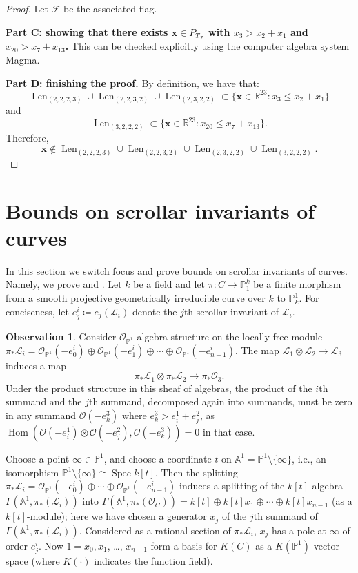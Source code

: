 \documentclass[letterpaper,10pt]{amsart}
\DeclareMathOperator{\Hom}{Hom}
\DeclareMathOperator{\Spec}{Spec}
\DeclareMathOperator{\Len}{Len}
\newcommand{\RR}{\mathbb{R}}      %
\newcommand{\AAA}{\mathbb{A}}      %
\newcommand{\cO}{\mathcal{O}}      %
\newcommand{\PP}{\mathbb{P}}      %
\newcommand{\cF}{\mathcal{F}}
\newcommand{\cL}{\mathcal{L}}
\theoremstyle{definition}
\newtheorem{observation}[theorem]{Observation}
\theoremstyle{remark}
\begin{document}
\begin{proof}
\noindent Let $\cF$ be the associated flag.  

\noindent \textbf{Part C: showing that there exists $\mathbf{x} \in P_{T_{\cF}}$ with $x_3 > x_2 + x_1$ and $x_{20} > x_7 + x_{13}$.}
This can be checked explicitly using the computer algebra system Magma.

\noindent \textbf{Part D: finishing the proof.}
By definition, we have that: 
\[
	\Len_{(2,2,2,3)} \cup \Len_{(2,2,3,2)} \cup \Len_{(2,3,2,2)} \subset \{\mathbf{x} \in \RR^{23} : x_{3} \leq x_2 + x_1 \}
\]
and 
\[
	\Len_{(3,2,2,2)} \subset \{\mathbf{x} \in \RR^{23} : x_{20} \leq x_7 + x_{13} \}.
\]
Therefore, 
\[
	\mathbf{x} \notin \Len_{(2,2,2,3)} \cup \Len_{(2,2,3,2)} \cup \Len_{(2,3,2,2)}  \cup \Len_{(3,2,2,2)}.
\]
\end{proof}

\section{Bounds on scrollar invariants of curves}
\label{sec:fn-field}

In this section we switch focus and prove bounds on scrollar invariants of curves. Namely, we prove  and . Let $k$ be a field and let $\pi \colon C \rightarrow \PP_1^k$ be a finite morphism from a smooth projective geometrically irreducible curve over $k$ to $\PP^1_k$. For conciseness, let $e_j^i \coloneqq e_j(\cL_i)$ denote the $j$th scrollar invariant of $\cL_i$. 

\begin{observation}
Consider $\cO_{\PP^1}$-algebra structure on the locally free module $\pi_* \cL_i = \cO_{\PP^1}(-e^i_0) \oplus \cO_{\PP^1}(-e^i_1) \oplus \cdots \oplus \cO_{\PP^1}(-e^i_{n-1})$. The map $\cL_1 \otimes \cL_2 \rightarrow \cL_3$ induces a map
\[
    \pi_* \cL_1 \otimes \pi_* \cL_2 \rightarrow \pi_* \cO_3. 
\]
Under the product structure in this sheaf of algebras, the product of the $i$th summand and the $j$th summand, decomposed again into summands, must be zero in any summand $\cO(-e^3_k)$ where $e^3_k > e^1_i + e^2_j$, as $\Hom(\cO(-e^1_i) \otimes \cO(-e^2_j), \cO(-e^3_k)) = 0$ in that case.  
\end{observation}

Choose a point $\infty \in \PP^1$, and choose a coordinate $t$ on $\AAA^1 = \PP^1 \setminus \{ \infty \}$, i.e., an isomorphism $\PP^1 \setminus \{ \infty \}  \cong \Spec k[t]$.  Then the splitting $\pi_* \cL_i = \cO_{\PP^1}(-e^i_0) \oplus \cdots \oplus \cO_{\PP^1}(-e^i_{n-1})$ induces a splitting of the $k[t]$-algebra
$\Gamma(\AAA^1, \pi_*(\cL_i))$ into
$\Gamma(\AAA^1, \pi_*(\cO_C)) = k[t] \oplus k[t] x_1 \oplus \cdots \oplus k[t] x_{n-1}$
(as a $k[t]$-module); here we have chosen a generator  $x_j$ of the $j$th summand  of $\Gamma(\AAA^1, \pi_*(\cL_i))$.
Considered as a rational section of $\pi_* \cL_i$, $x_j$ has a pole at $\infty$ of order $e^i_j$.  Now $1=x_0, x_1$, \dots, $x_{n-1}$ form a basis for $K(C)$ as a $K(\PP^1)$-vector space (where $K(\cdot)$ indicates the function field). 
\end{document}
